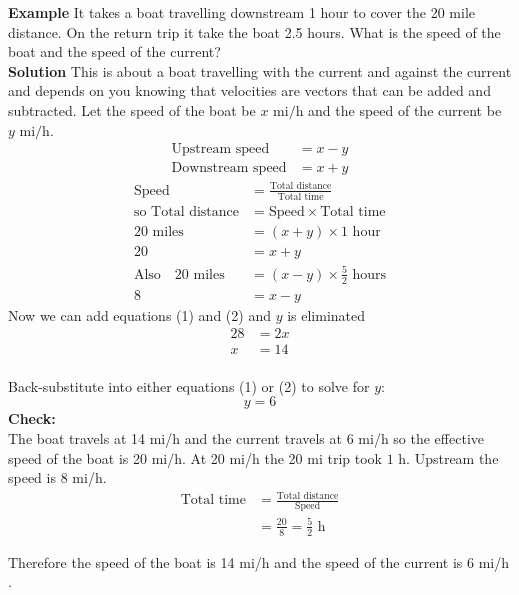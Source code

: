 \textbf{Example} It takes a boat travelling downstream 1 hour to cover the 20 mile distance. On the return trip it take the boat 2.5 hours. What is the speed of the boat and the speed of the current?\\
 \textbf{Solution} This is about a boat travelling with the current and against the current and depends on you knowing that velocities are vectors that can be added and subtracted. Let the speed of the boat be $x$ \mbox{mi}$/$\mbox{h} and the speed of the current be $y$ \mbox{mi}$/$\mbox{h}. 
 	\begin{align*}\text{Upstream speed} &  =  x -y \\
 	\text{Downstream speed} &  =  x +y\end{align*}
 	\begin{align}\text{Speed} &  =  \frac{\text{Total distance}}{\text{Total time}} \nonumber  \\
 	\text{so Total distance} &  =  \text{Speed} \times \text{Total time} \nonumber  \\
 	20 \textrm{ miles } &  =  \left (x +y\right ) \times 1 \textrm{ hour} \nonumber  \\
 	20 &=x +y \tag{1} \\
 	\text{Also}\quad 20 \textrm{ miles }&  =  \left (x -y\right ) \times \frac{5}{2} \textrm{ hours}\nonumber  \\
 	8 &=x -y \tag{2}\end{align}
 Now we can add equations (1) and (2) and $y$ is eliminated
 \begin{align*}28 &  =  2 x \\
 x &  =  14\end{align*} \\
 Back-substitute into either equations (1) or (2) to solve for $y$:
$$ y =  6$$
 \textbf{Check:} \\\relax The boat travels
 at 14 $\mbox{mi}$/$\mbox{h}$ and the current travels at 6 $\mbox{mi}$/$\mbox{h}$ so the effective speed of the
 boat is 20 $\mbox{mi}$/$\mbox{h}$. At 20 $\mbox{mi}$/$\mbox{h}$ the 20 $\mbox{mi}$ trip took $1$ $\mbox{h}$. Upstream the speed is 8 $\mbox{mi}$/$\mbox{h}$. \
 \begin{align*}\text{Total time} &  =  \frac{\text{Total distance}}{\text{Speed}} \\
 &  =  \frac{20}{8} =\frac{5}{2} \text{ h}\end{align*}
 
 Therefore the speed of the boat is 14 $\mbox{mi}$/$\mbox{h}$ and the speed of the current is 6 $\mbox{mi}$/$\mbox{h}$. 
 
